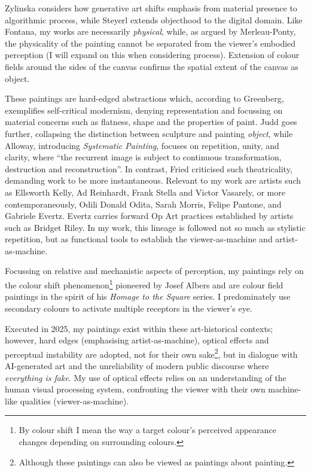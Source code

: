 \documentclass[12pt]{article}
\begin{document}
Zylinska considers how generative art shifts emphasis from material
presence to algorithmic process,\autocite{zylinska2020ai} while Steyerl
extends objecthood to the digital domain.\autocite{steyerl2017duty} Like
Fontana, my works are necessarily
\emph{physical},\autocite{fontana1947spatial} while, as argued by
Merleau-Ponty, the physicality of the painting cannot be separated
from the viewer's embodied perception (I will expand on this when
considering process).\autocite{merleauponty1964eye} Extension of colour
fields around the sides of the canvas confirms the spatial extent of
the canvas as object.

These paintings are hard-edged abstractions which, according to
Greenberg, exemplifies self-critical modernism, denying representation
and focussing on material concerns such as flatness, shape and the
properties of paint.\autocite[p.~85--93]{Greenberg1961} Judd goes further,
collapsing the distinction between sculpture and painting
\emph{object}\autocite{Judd1965}, while Alloway, introducing
\emph{Systematic Painting}, focuses on repetition, unity, and clarity,
where ``the recurrent image is subject to continuous transformation,
destruction and reconstruction''.\autocite[pp.~18--19]{Alloway1975} In
contrast, Fried criticised such theatricality, demanding work to be
more instantaneous.\autocite[pp.~12--23]{Fried1968} Relevant to my work are
artists such as Ellsworth Kelly, Ad Reinhardt, Frank Stella and Victor
Vasarely, or more contemporaneously, Odili Donald Odita, Sarah Morris,
Felipe Pantone, and Gabriele Evertz. Evertz carries forward Op Art
practices\autocite{Follin2004EmbodiedVisions,Seitz1965ResponsiveEye}
established by artists such as Bridget
Riley.\autocite{Riley2019EyesMind,Riley2019DialoguesOnArt} In my work,
this lineage is followed not so much as stylistic repetition, but as
functional tools to establish the viewer-as-machine and artist-as-machine.

Focussing on relative and mechanistic aspects of perception, my
paintings rely on the colour shift phenomenon\footnote{By colour shift
  I mean the way a target colour’s perceived appearance changes
  depending on surrounding colours.} pioneered by Josef
Albers\autocite{albers} and are colour field paintings in the spirit
of his \emph{Homage to the Square} series. I predominately use
secondary colours to activate multiple receptors in the viewer's
eye.\autocite{HurvichJameson1957,Land1977,SchnapfKraftBaylor1987}

Executed in 2025, my paintings exist within these art-historical
contexts; however, hard edges (emphasising artist-as-machine),
optical effects and perceptual instability are adopted, not for their
own sake\footnote{Although these paintings can also be viewed as
  paintings about painting.}, but in dialogue with AI-generated art
and the unreliability of modern public discourse where \emph{everything is
fake}.\autocite[p.~105]{mcintyre2018posttruth} My use of optical effects relies on an understanding of the human
visual processing system, confronting the viewer with their own
machine-like qualities (viewer-as-machine).
\end{document}
